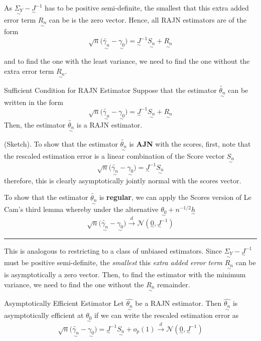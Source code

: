 \documentclass[twoside]{article}
\newenvironment{proof}{{\bf Proof:}}{\hfill\rule{2mm}{2mm}}
\newcommand{\utilde}{\underset{\sim}}
\begin{document}
As $\utilde{\Sigma_{Y}} - \utilde{J}^{-1}$ has to be positive semi-definite, the smallest that this extra added error term $\utilde{R_{n}}$ can be is the zero vector. Hence, all RAJN estimators are of the form 
$$
\sqrt{n}\big(\tilde{\utilde{\gamma_{n}}} - \utilde{\gamma_{0}} \big) = \utilde{J}^{-1}\utilde{S_{n}} + \utilde{R_{n}}
$$

and to find the one with the least variance, we need to find the one without the extra error term $\utilde{R_{n}}.$

\begin{proposition_exam}{Sufficient Condition for RAJN Estimator}{} Suppose that the estimator $\tilde{\utilde{\theta_{n}}}$ can be written in the form
$$
\sqrt{n}\big(\tilde{\utilde{\gamma_{n}}} - \utilde{\gamma_{0}} \big) = \utilde{J}^{-1}\utilde{S_{n}} + \utilde{R_{n}}
$$
Then, the estimator $\tilde{\utilde{\theta_{n}}}$ is a RAJN estimator.
\end{proposition_exam}

\begin{proof} (Sketch). To show that the estimator $\tilde{\utilde{\theta_{n}}}$ is \textbf{AJN} with the scores, first, note that the rescaled estimation error is a linear combination of the Score vector $\utilde{S_{n}}$
$$
\sqrt{n}\big(\tilde{\utilde{\gamma_{n}}} - \utilde{\gamma_{0}} \big) = \utilde{J}^{-1}\utilde{S_{n}}
$$
therefore, this is clearly asymptotically jointly normal with the scores vector. 

To show that the estimator $\tilde{\utilde{\theta_{n}}}$ is \textbf{regular}, we can apply the Scores version of Le Cam's third lemma whereby under the alternative $\utilde{\theta_{0}} + n^{-1/2}\utilde{h}$
$$
\sqrt{n}\big(\tilde{\utilde{\gamma_{n}}} - \utilde{\gamma_{0}} \big) \xrightarrow{d} \mathcal{N}(\utilde{0}, \utilde{J}^{-1})
$$
\end{proof}



This is analogous to restricting to a class of unbiased estimators. Since $\utilde{\Sigma_{Y}} - \utilde{J}^{-1}$ must be positive semi-definite, the \textit{smallest} this \textit{extra added error term} $\utilde{R_{n}}$ can be is asymptotically a zero vector. Then, to find the estimator with the minimum variance, we need to find the one without the $\utilde{R_{n}}$ remainder.

\begin{definition_exam}{Asymptotically Efficient Estimator}{} Let $\hat{\utilde{\theta_{n}}}$ be a RAJN estimator. Then $\hat{\utilde{\theta_{n}}}$ is asymptotically efficient at $\utilde{\theta_{0}}$ if we can write the rescaled estimation error as 
$$
\sqrt{n}\big(\tilde{\utilde{\gamma_{n}}} - \utilde{\gamma_{0}} \big) = \utilde{J}^{-1}\utilde{S_{n}} + o_p(1) \xrightarrow{d} \mathcal{N}(\utilde{0}, \utilde{J}^{-1})
$$
\end{definition_exam}
\end{document}
